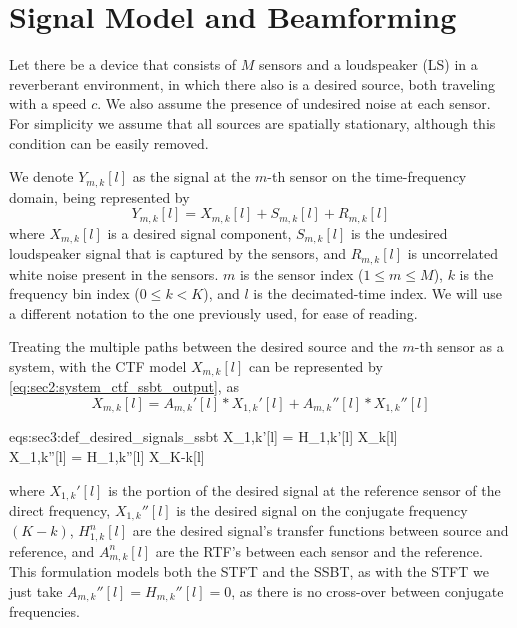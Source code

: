 \section{Signal Model and Beamforming}
\label{sec:signal_model}

Let there be a device that consists of $M$ sensors and a loudspeaker (LS) in a reverberant environment, in which there also is a desired source, both traveling with a speed $c$. We also assume the presence of undesired noise at each sensor. For simplicity we assume that all sources are spatially stationary, although this condition can be easily removed.

We denote $Y_{m,k}[l]$ as the signal at the $m$-th sensor on the time-frequency domain, being represented by
\begin{equation}
	\label{eq:sec3:system_time-freq_domain_base}
	Y_{m,k}[l] = X_{m,k}[l] + S_{m,k}[l] + R_{m,k}[l]
\end{equation}
where $X_{m,k}[l]$ is a desired signal component, $S_{m,k}[l]$ is the undesired loudspeaker signal that is captured by the sensors, and $R_{m,k}[l]$ is uncorrelated white noise present in the sensors. $m$ is the sensor index ($1 \leq m \leq M$), $k$ is the frequency bin index ($0 \leq k < K$), and $l$ is the decimated-time index. We will use a different notation to the one previously used, for ease of reading.

Treating the multiple paths between the desired source and the $m$-th sensor as a system, with the CTF model $X_{m,k}[l]$ can be represented by \cref{eq:sec2:system_ctf_ssbt_output}, as
\begin{equation}
	\label{eq:sec3:def_ctf_ssbt}
	X_{m,k}[l] = A_{m,k}'[l] \ast X_{1,k}'[l] + A_{m,k}''[l] \ast X_{1,k}''[l]
\end{equation}\vspace*{-2em}
\begin{subgather}{eqs:sec3:def_desired_signals_ssbt}
	X_{1,k}'[l] = H_{1,k}'[l] \ast X_k[l] \\
	X_{1,k}''[l] = H_{1,k}''[l] \ast X_{K-k}[l]
\end{subgather}
where $X_{1,k}'[l]$ is the portion of the desired signal at the reference sensor of the direct frequency, $X_{1,k}''[l]$ is the desired signal on the conjugate frequency $(K-k)$, $H^n_{1,k}[l]$ are the desired signal's transfer functions between source and reference, and $A^n_{m,k}[l]$ are the RTF's between each sensor and the reference. This formulation models both the STFT and the SSBT, as with the STFT we just take $A_{m,k}''[l] = H_{m,k}''[l] = 0$, as there is no cross-over between conjugate frequencies.

